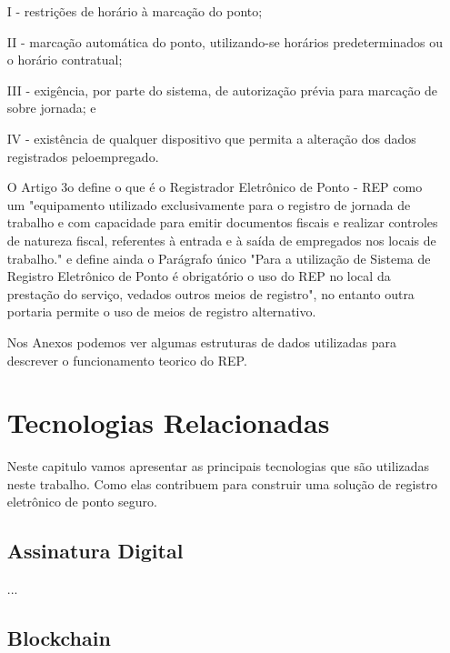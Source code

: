 \documentclass[12pt,openright,twoside,a4paper,english, brazil]{abntex2} %
\begin{document}
\begin{itemize}
	\item [I] - restrições de horário à marcação do ponto;
  \item [II] - marcação automática do ponto, utilizando-se horários predeterminados ou o horário contratual;
  \item [III] - exigência, por parte do sistema, de autorização prévia para marcação de sobre jornada; e
  \item [IV] - existência de qualquer dispositivo que permita a alteração dos dados registrados peloempregado.

O Artigo 3o define o que é o Registrador Eletrônico de Ponto - REP como um "equipamento utilizado exclusivamente para o registro de jornada de trabalho e com capacidade para emitir documentos fiscais e realizar controles de natureza fiscal, referentes à entrada e à saída de empregados nos locais de trabalho." e define ainda o Parágrafo único "Para a utilização de Sistema de Registro Eletrônico de Ponto é obrigatório o uso do REP no local da prestação do serviço, vedados outros meios de registro", no entanto outra portaria permite o uso de meios de registro alternativo.


Nos Anexos podemos ver algumas estruturas de dados utilizadas para descrever o funcionamento teorico do \gls{REP}.


\chapter{Tecnologias Relacionadas}


Neste capitulo vamos apresentar as principais tecnologias que são utilizadas neste trabalho. Como elas contribuem para construir uma solução de registro eletrônico de ponto seguro.

\section{Assinatura Digital}

...

\section{Blockchain}


\end{itemize}
\end{document}
